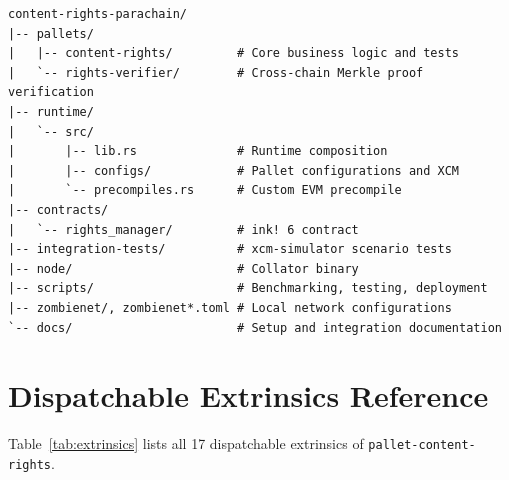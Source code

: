 \begin{lstlisting}[basicstyle=\ttfamily\footnotesize,frame=single,numbers=none]
content-rights-parachain/
|-- pallets/
|   |-- content-rights/         # Core business logic and tests
|   `-- rights-verifier/        # Cross-chain Merkle proof verification
|-- runtime/
|   `-- src/
|       |-- lib.rs              # Runtime composition
|       |-- configs/            # Pallet configurations and XCM
|       `-- precompiles.rs      # Custom EVM precompile
|-- contracts/
|   `-- rights_manager/         # ink! 6 contract
|-- integration-tests/          # xcm-simulator scenario tests
|-- node/                       # Collator binary
|-- scripts/                    # Benchmarking, testing, deployment
|-- zombienet/, zombienet*.toml # Local network configurations
`-- docs/                       # Setup and integration documentation
\end{lstlisting}

\section{Dispatchable Extrinsics Reference}\label{sec:extrinsics-reference}

Table~\ref{tab:extrinsics} lists all 17 dispatchable extrinsics of \texttt{pallet-content-rights}.

